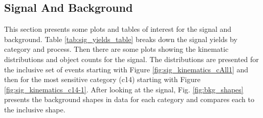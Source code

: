 \clearpage
\subsection{Signal And Background}

This section presents some plots and tables of interest for the signal and background. Table \ref{tab:sig_yields_table} breaks
down the signal yields by category and process. Then there are some plots showing the kinematic distributions and object counts for the signal.
The distributions are presented for the inclusive set of events starting with Figure \ref{fig:sig_kinematics_cAll1} and then for the most sensitive category (c14)
starting with Figure \ref{fig:sig_kinematics_c14-1}. After looking at the signal, Fig. \ref{fig:bkg_shapes} presents the background shapes in data
for each category and compares each to the inclusive shape.

